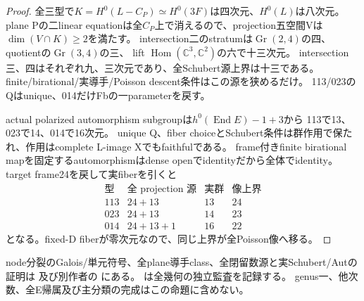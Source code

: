 \documentclass[a4paper,11pt]{ltjsarticle}
\theoremstyle{definition}
\begin{document}
\begin{proof}
全三型で$K=H^0(L-C_P)\simeq H^0(3F)$は四次元、$H^0(L)$は八次元。
plane Pの二linear equationは全$C_P$上で消えるので、projection五空間Vは$\dim(V\cap K)\ge2$を満たす。
intersection二のstratumは$\operatorname{Gr}(2,4)$の四、quotientの$\operatorname{Gr}(3,4)$の三、
lift $\operatorname{Hom}(\mathbb C^3,\mathbb C^2)$の六で十三次元。
intersection三、四はそれぞれ九、三次元であり、全Schubert源上界は十三である。
finite/birational/実導手/Poisson descent条件はこの源を狭めるだけ。
113/023のQはunique、014だけFbの一parameterを戻す。

actual polarized automorphism subgroupは$h^0(\operatorname{End}E)-1+3$から
113で13、023で14、014で16次元。
unique Q、fiber choiceとSchubert条件は群作用で保たれ、作用はcomplete L-image Xでもfaithfulである。
frame付きfinite birational mapを固定するautomorphismはdense openでidentityだから全体でidentity。
target frame24を戻して実fiberを引くと
\[
 \begin{array}{c|c|c|c}
 \text{型}&\text{全 projection 源}&\text{実群}&\text{像上界}\\ \hline
 113&24+13&13&24\\
 023&24+13&14&23\\
 014&24+13+1&16&22
 \end{array}
\]
となる。fixed-D fiberが零次元なので、同じ上界が全Poisson像へ移る。
\end{proof}
node分裂のGalois/単元符号、全plane導手class、全閉留数源と実Schubert/Autの証明は
及び別作者の
にある。
は全幾何の独立監査を記録する。
genus一、他次数、全E帰属及び主分類の完成はこの命題に含めない。
\end{document}
